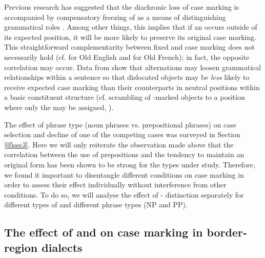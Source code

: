 \documentclass[output=paper,colorlinks,citecolor=brown]{langscibook}
\begin{document}
Previous research has suggested that the diachronic loss of case marking is accompanied by compensatory freezing of  as a means of distinguishing grammatical roles \citep{blake2004}. Among other things, this implies that if an   occurs outside of its expected position, it will be more likely to preserve its original case marking. This straightforward complementarity between fixed  and case marking does not necessarily hold (cf. \citealt{allen2006} for Old English and \citealt{detges2009} for Old French); in fact, the opposite correlation may occur. Data from  show that  alternations may loosen grammatical relationships within a sentence so that dislocated objects may be \textit{less} likely to receive expected case marking than their counterparts in neutral positions within a basic constituent structure (cf.  scrambling of -marked objects to a position where only the  may be assigned, \citealt{kasai2018}).

The effect of phrase type (noun phrases vs. prepositional phrases) on case selection and decline of one of the competing cases was surveyed in Section \ref{05sec3}. Here we will only reiterate the observation made above that the correlation between the use of prepositions and the tendency to maintain an original  form has been shown to be strong for the  types under study. Therefore, we found it important to disentangle different conditions on case marking in order to assess their effect individually without interference from other conditions. To do so, we will analyse the effect of - distinction separately for different types of  and different phrase types (NP and PP).

\subsection{The effect of  and  on case marking in  border-region dialects} \label{05sec4.4}
\end{document}
